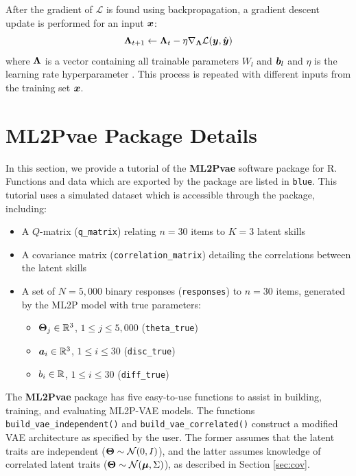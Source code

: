 After the gradient of $\mathcal{L}$ is found using backpropagation, a gradient descent update is performed for an input $\boldsymbol{x}$:
\begin{equation}
  \boldsymbol{\Lambda}_{t+1} \gets \boldsymbol{\Lambda}_{t} - \eta \nabla_{\boldsymbol{\Lambda}} \mathcal{L}(\boldsymbol{y}, \hat{\boldsymbol{y}})
  \label{eq:grad_update}
\end{equation}
where $\boldsymbol{\Lambda}$ is a vector containing all trainable parameters $W_l$ and $\boldsymbol{b}_l$ and $\eta$ is the learning rate hyperparameter \cite{ruder2017}. This process is repeated with different inputs from the training set $\boldsymbol{x}$. 


\chapter{\textbf{ML2Pvae} Package Details}
In this section, we provide a tutorial of the \textbf{ML2Pvae} software package for R. Functions and data which are exported by the package are listed in {\color{blue}\verb!blue!}. This tutorial uses a simulated dataset which is accessible through the package, including:
\begin{itemize}
  \item A $Q$-matrix ({\color{blue}\verb!q_matrix!}) relating $n = 30$ items to $K = 3$ latent skills
  \item A covariance matrix ({\color{blue}\verb!correlation_matrix!}) detailing the correlations between the latent skills
  \item A set of $N = 5,000$ binary responses ({\color{blue}\verb!responses!}) to $n = 30$ items, generated by the ML2P model with true parameters:
    \begin{itemize}
      \item $\boldsymbol{\Theta}_j \in \mathbb{R}^3$, $1\leq j \leq 5,000$ ({\color{blue}\verb!theta_true!})
      \item $\boldsymbol{a}_i \in \mathbb{R}^3$, $1\leq i \leq 30$ ({\color{blue}\verb!disc_true!})
      \item $b_i\in \mathbb{R}$, $1\leq i \leq 30$ ({\color{blue}\verb!diff_true!}) 
    \end{itemize}
\end{itemize}

The \textbf{ML2Pvae} package has five easy-to-use functions to assist in building, training, and evaluating ML2P-VAE models. The functions {\color{blue}\verb!build_vae_independent()!} and {\color{blue}\verb!build_vae_correlated()!} construct a modified VAE architecture as specified by the user. The former assumes that the latent traits are independent ($\boldsymbol{\Theta} \sim \mathcal{N}(0,I)$), and the latter assumes knowledge of correlated latent traits ($\boldsymbol{\Theta} \sim \mathcal{N}(\boldsymbol{\mu}, \Sigma)$), as described in Section \ref{sec:cov}.

